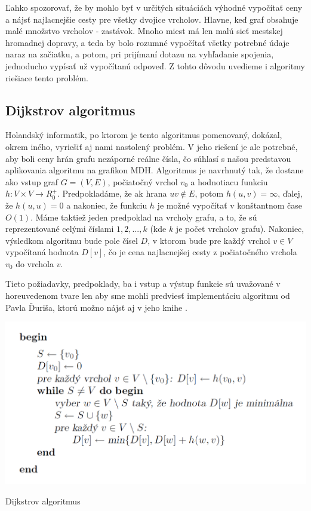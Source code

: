Ľahko spozorovať, že by mohlo byť v určitých situáciách výhodné vypočítať ceny a nájsť najlacnejšie cesty pre všetky dvojice vrcholov. Hlavne, keď graf obsahuje malé množstvo vrcholov - zastávok. Mnoho miest má len malú sieť mestskej hromadnej dopravy, a teda by bolo rozumné vypočítať všetky potrebné údaje naraz na začiatku, a potom, pri prijímaní dotazu na vyhľadanie spojenia, jednoducho vypísať už vypočítanú odpoveď. Z tohto dôvodu uvedieme i algoritmy riešiace tento problém.\newline

\subsection{Dijkstrov algoritmus}

Holandský informatik, po ktorom je tento algoritmus pomenovaný, dokázal, okrem iného, vyriešiť aj nami nastolený problém. V jeho riešení je ale potrebné, aby boli ceny hrán grafu nezáporné reálne čísla, čo súhlasí s našou predstavou aplikovania algoritmu na grafikon MDH. Algoritmus je navrhnutý tak, že dostane ako vstup graf $G = (V, E)$, počiatočný vrchol $v_{0}$ a hodnotiacu funkciu $h: V \times V \rightarrow R^{+}_{0}$. Predpokladáme, že ak hrana $uv \notin E$, potom $h(u,v) = \infty$, ďalej, že $h(u,u) = 0$ a nakoniec, že funkciu $h$ je možné vypočítať v konštantnom čase $O(1)$. Máme taktiež jeden predpoklad na vrcholy grafu, a to, že sú reprezentované celými číslami $1, 2, ..., k$ (kde $k$ je počet vrcholov grafu). Nakoniec, výsledkom algoritmu bude pole čísel $D$, v ktorom bude pre každý vrchol $v \in V$ vypočítaná hodnota $D [v]$, čo je cena najlacnejšej cesty z počiatočného vrchola $v_{0}$ do vrchola $v$. \newline

Tieto požiadavky, predpoklady, ba i vstup a výstup funkcie sú uvažované v horeuvedenom tvare len aby sme mohli predviesť implementáciu algoritmu od Pavla Ďuriša, ktorú možno nájsť aj v jeho knihe \cite[kapitola 2.2.1]{duris2009}.\newline

\begin{algorithm}[H]
  \includegraphics[width=\linewidth]{./images/Alg_Dijkstra.png}
  \caption{Dijkstrov algoritmus}
  \label{Alg_Dijkstra}
  \centering
\end{algorithm}

